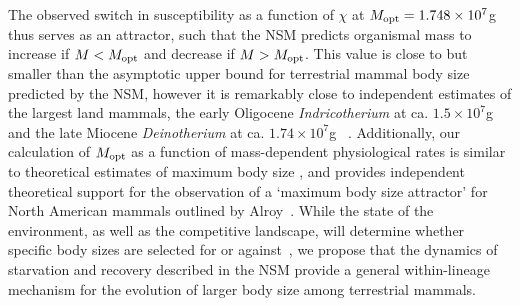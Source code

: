 \documentclass[twocolumn,preprintnumbers,amsmath,amssymb,superscriptaddress]{revtex4}
\begin{document}
\begin{bibunit}[unsrt]
The observed switch in susceptibility as a function of $\chi$ at $M_{\rm opt}= 1.748\times10^7$g thus serves as an attractor, such that the NSM predicts organismal mass to increase if $M<M_{\rm opt}$ and decrease if $M>M_{\rm opt}$.
This value is close to but smaller than the asymptotic upper bound for terrestrial mammal body size predicted by the NSM, however it is remarkably close to independent estimates of the largest land mammals, the early Oligocene \emph{Indricotherium} at ca. $1.5\times10^7$g and the late Miocene \emph{Deinotherium} at ca. $1.74\times10^7$g ~\citep{Smith:2010p3442}.
Additionally, our calculation of $M_{\rm opt}$ as a function of mass-dependent physiological rates is similar to theoretical estimates of maximum body size \citep{Clauset:2009fh}, and provides independent theoretical support for the observation of a `maximum body size attractor' for North American mammals outlined by Alroy~\citep{Alroy:1998p1594}.
While the state of the environment, as well as the competitive landscape, will determine whether specific body sizes are selected for or against~\citep{Saarinen:2014br}, we propose that the dynamics of starvation and recovery described in the NSM provide a general within-lineage mechanism for the evolution of larger body size among terrestrial mammals.






\end{bibunit}
\end{document}

